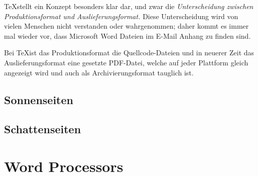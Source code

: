 \TeX stellt ein Konzept besonders klar dar, und zwar die \emph{Unterscheidung
zwischen Produktionsformat und Auslieferungsformat.} Diese Unterscheidung
wird von vielen Menschen nicht verstanden oder wahrgenommen; daher kommt
es immer mal wieder vor, dass Microsoft Word Dateien im E-Mail Anhang zu
finden sind.

Bei \TeX ist das Produktionsformat die Quellcode-Dateien und in neuerer
Zeit das Auslieferungsformat eine gesetzte PDF-Datei, welche auf jeder
Plattform gleich angezeigt wird und auch als Archivierungsformat tauglich
ist.

\subsection{Sonnenseiten}

\subsection{Schattenseiten}

\section{Word Processors}


